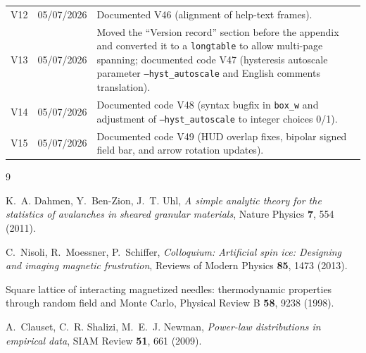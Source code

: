 \documentclass[11pt,a4paper]{article}
\newcommand{\code}[1]{\texttt{#1}}
\begin{document}
\begin{tabular}{@{}lll@{}}
V12 & 05/07/2026 & Documented V46 (alignment of help-text frames). \\
V13 & 05/07/2026 & Moved the ``Version record'' section before the appendix and converted it to a \code{longtable} to allow multi-page spanning; documented code V47 (hysteresis autoscale parameter \code{--hyst\_autoscale} and English comments translation). \\
V14 & 05/07/2026 & Documented code V48 (syntax bugfix in \code{box\_w} and adjustment of \code{--hyst\_autoscale} to integer choices 0/1). \\
V15 & 05/07/2026 & Documented code V49 (HUD overlap fixes, bipolar signed field bar, and arrow rotation updates). \\
\bottomrule
\end{tabular}

\begin{thebibliography}{9}

K.~A. Dahmen, Y.~Ben-Zion, J.~T. Uhl,
\emph{A simple analytic theory for the statistics of avalanches in
sheared granular materials},
Nature Physics \textbf{7}, 554 (2011).

C.~Nisoli, R.~Moessner, P.~Schiffer,
\emph{Colloquium: Artificial spin ice: Designing and imaging magnetic
frustration},
Reviews of Modern Physics \textbf{85}, 1473 (2013).

Square lattice of interacting magnetized needles: thermodynamic
properties through random field and Monte Carlo,
Physical Review B \textbf{58}, 9238 (1998).

A.~Clauset, C.~R. Shalizi, M.~E.~J. Newman,
\emph{Power-law distributions in empirical data},
SIAM Review \textbf{51}, 661 (2009).

\end{thebibliography}
\end{document}
